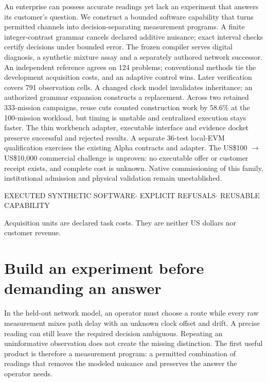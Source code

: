 \documentclass[11pt,letterpaper]{article}
\theoremstyle{definition}\newtheorem{definition}[theorem]{Definition}
\theoremstyle{remark}\newtheorem{remark}[theorem]{Remark}
\begin{document}
\begin{titlepage}
\vspace{.65cm}
\noindent{\color{purple}\rule{\linewidth}{1.1pt}}
\vspace{.15cm}
\par
\small
An enterprise can possess accurate readings yet lack an experiment that answers its customer's question. We construct a bounded software capability that turns permitted channels into decision-separating measurement programs. A finite integer-contrast grammar cancels declared additive nuisance; exact interval checks certify decisions under bounded error. The frozen compiler serves digital diagnosis, a synthetic mixture assay and a separately authored network successor. An independent reference agrees on 124 problems; conventional methods tie the development acquisition costs, and an adaptive control wins. Later verification covers 791 observation cells. A changed clock model invalidates inheritance; an authorized grammar expansion constructs a replacement. Across two retained 333-mission campaigns, reuse cuts counted construction work by 58.6\% at the 100-mission workload, but timing is unstable and centralized execution stays faster. The thin workbench adapter, executable interface and evidence docket preserve successful and rejected results. A separate 36-test local-EVM qualification exercises the existing Alpha contracts and adapter. The US\$100 $\rightarrow$ US\$10,000 commercial challenge is unproven: no executable offer or customer receipt exists, and complete cost is unknown. Native commissioning of this family, institutional admission and physical validation remain unestablished.
\normalsize
\vfill
\noindent\begin{minipage}{\linewidth}
{\footnotesize\sffamily\color{purple}EXECUTED SYNTHETIC SOFTWARE\quad $\cdot$ \quad EXPLICIT REFUSALS\quad $\cdot$ \quad REUSABLE CAPABILITY\par}
\smallskip
{\footnotesize\color{muted}Acquisition units are declared task costs. They are neither US dollars nor customer revenue.\par}
\end{minipage}
\end{titlepage}

\section{Build an experiment before demanding an answer}
In the held-out network model, an operator must choose a route while every raw measurement mixes path delay with an unknown clock offset and drift. A precise reading can still leave the required decision ambiguous. Repeating an uninformative observation does not create the missing distinction. The first useful product is therefore a measurement program: a permitted combination of readings that removes the modeled nuisance and preserves the answer the operator needs.
\end{document}
